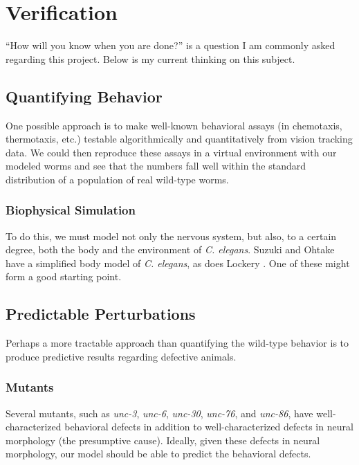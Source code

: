 \documentclass[letter,11pt]{article}
\newcommand{\cel}{{\em C. elegans}}
\begin{document}
\section{Verification}

``How will you know when you are done?'' is a question I am commonly asked regarding this project.
Below is my current thinking on this subject.

\subsection{Quantifying Behavior}

One possible approach is to make well-known behavioral assays (in chemotaxis,
thermotaxis, etc.) testable algorithmically and quantitatively from vision
tracking data.  We could then reproduce these assays in a virtual environment
with our modeled worms and see that the numbers fall well within the standard
distribution of a population of real wild-type worms.

\subsubsection{Biophysical Simulation}

To do this, we must model not only the nervous system, but also, to a certain degree, both the body and the environment of \cel .
Suzuki and Ohtake \cite{ohtake} have a simplified body model of \cel , as does Lockery \cite{lockery1010}. One of these might form
a good starting point.

\subsection{Predictable Perturbations}

Perhaps a more tractable approach than quantifying the wild-type behavior is to produce predictive results regarding defective animals.

\subsubsection{Mutants}

Several mutants, such as {\em unc-3}, {\em unc-6}, {\em unc-30}, {\em unc-76}, and {\em unc-86}, have well-characterized behavioral defects
in addition to well-characterized defects in neural morphology (the presumptive cause). Ideally, given these defects in neural morphology,
our model should be able to predict the behavioral defects.
\end{document}
